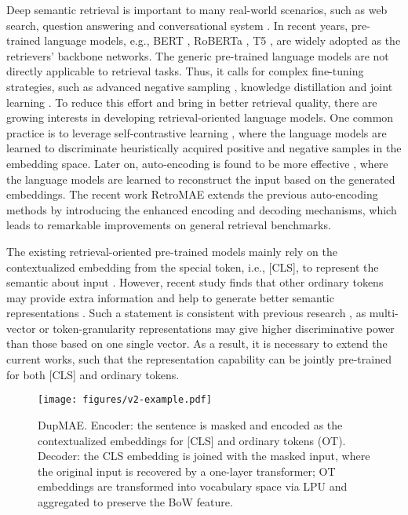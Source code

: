 \documentclass[11pt,a4paper]{article}
\begin{document}
Deep semantic retrieval is important to many real-world scenarios, such as web search, question answering and conversational system \cite{huang2013learning,karpukhin2020dense,komeili2021internet,izacard2022few}. In recent years, pre-trained language models, e.g., BERT \cite{Devlin2019BERT}, RoBERTa \cite{Liu2019Roberta}, T5 \cite{raffel2019exploring}, are widely adopted as the retrievers' backbone networks. The generic pre-trained language models are not directly applicable to retrieval tasks. Thus, it calls for complex fine-tuning strategies, such as advanced negative sampling \cite{xiong2020approximate,qu2020rocketqa}, knowledge distillation \cite{hofstatter2021efficiently,lu2022ernie} and joint learning \cite{ren2021rocketqav2,zhang2021adversarial}. To reduce this effort and bring in better retrieval quality, there are growing interests in developing retrieval-oriented language models. One common practice is to leverage self-contrastive learning \cite{chang2020pre,guu2020realm}, where the language models are learned to discriminate heuristically acquired positive and negative samples in the embedding space. Later on, auto-encoding is found to be more effective \cite{wang2021tsdae,lu2021less}, where the language models are learned to reconstruct the input based on the generated embeddings. The recent work RetroMAE \cite{liu2022retromae} extends the previous auto-encoding methods by introducing the enhanced encoding and decoding mechanisms, which leads to remarkable improvements on general retrieval benchmarks. 


The existing retrieval-oriented pre-trained models mainly rely on the contextualized embedding from the special token, i.e., [CLS], to represent the semantic about input \cite{gao2021condenser,lu2021less,liu2022retromae,wang2022simlm}. However, recent study finds that other ordinary tokens may provide extra information and help to generate better semantic representations \cite{lin2022aggretriever}. Such a statement is consistent with previous research \cite{luan2021sparse,santhanam2021colbertv2}, as multi-vector or token-granularity representations may give higher discriminative power than those based on one single vector. As a result, it is necessary to extend the current works, such that the representation capability can be jointly pre-trained for both [CLS] and ordinary tokens. 

\begin{figure}[t]
\centering
\texttt{[image: figures/v2-example.pdf]}
\caption{{DupMAE}. Encoder: the sentence is masked and encoded as the contextualized embeddings for [CLS] and ordinary tokens (OT). Decoder: the CLS embedding is joined with the masked input, where the original input is recovered by a one-layer transformer; OT embeddings are transformed into vocabulary space via LPU and aggregated to preserve the BoW feature.} 
\label{fig:1}
\end{figure}
\end{document}
